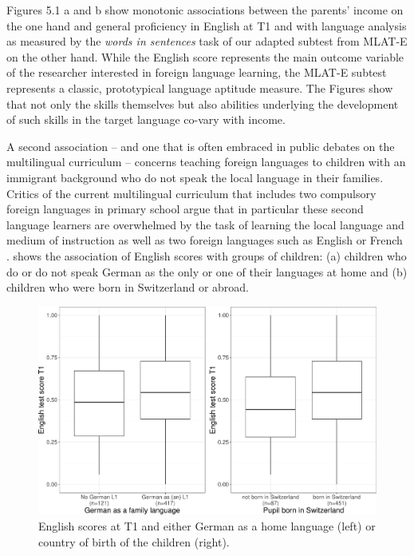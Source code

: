 \documentclass[output=paper]{langsci/langscibook}
\begin{document}
Figures 5.1 a and b show monotonic associations between the parents’ income on the one hand and general proficiency in English at T1 and with language analysis as measured by the \textit{words in sentences} task of our adapted subtest from MLAT-E on the other hand. While the English score represents the main outcome variable of the researcher interested in foreign language learning, the MLAT-E subtest represents a classic, prototypical language aptitude measure. The Figures show that not only the skills themselves but also abilities underlying the development of such skills in the target language co-vary with income.

A second association -- and one that is often embraced in public debates on the multilingual curriculum -- concerns teaching foreign languages to children with an immigrant background who do not speak the local language in their families. Critics of the current multilingual curriculum that includes two compulsory foreign languages in primary school argue that in particular these second language learners are overwhelmed by the task of learning the local language and medium of instruction as well as two foreign languages such as English or French \citep{KüblerEtAl2014}.  shows the association of English scores with groups of children: (a) children who do or do not speak German as the only or one of their languages at home and (b) children who were born in Switzerland or abroad.

\begin{figure}
\includegraphics[width=\textwidth]{figures/Figure5.2.pdf}
\caption{English scores at T1 and either German as a home language (left) or country of birth of the children (right).\label{fig:05:2}}
\end{figure}
\end{document}
